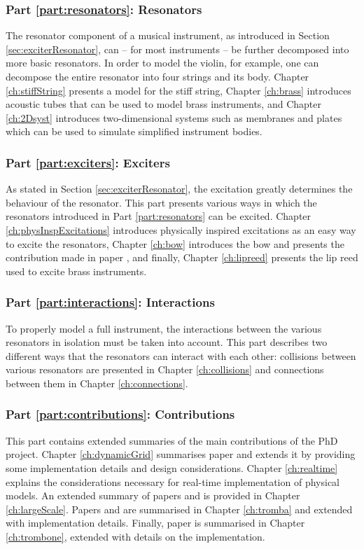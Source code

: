 \subsubsection{Part \ref{part:resonators}: Resonators}
The resonator component of a musical instrument, as introduced in Section \ref{sec:exciterResonator}, can -- for most instruments -- be further decomposed into more basic resonators. In order to model the violin, for example, one can decompose the entire resonator into four strings and its body. Chapter \ref{ch:stiffString} presents a model for the stiff string, Chapter \ref{ch:brass} introduces acoustic tubes that can be used to model brass instruments, and Chapter \ref{ch:2Dsyst} introduces two-dimensional systems such as membranes and plates which can be used to simulate simplified instrument bodies.

\subsubsection{Part \ref{part:exciters}: Exciters} 
As stated in Section \ref{sec:exciterResonator}, the excitation greatly determines the behaviour of the resonator. This part
presents various ways in which the resonators introduced in Part \ref{part:resonators} can be excited. Chapter \ref{ch:physInspExcitations} introduces physically inspired excitations as an easy way to excite the resonators, Chapter \ref{ch:bow} introduces the bow and presents the contribution made in paper \citeP[C], and finally, Chapter \ref{ch:lipreed} presents the lip reed used to excite brass instruments.

\subsubsection{Part \ref{part:interactions}: Interactions}
To properly model a full instrument, the interactions between the various resonators in isolation must be taken into account. This part describes two different ways that the resonators can interact with each other: collisions between various resonators are presented in Chapter \ref{ch:collisions} and connections between them in Chapter \ref{ch:connections}. 

\subsubsection{Part \ref{part:contributions}: Contributions} This part contains extended summaries of the main contributions of the PhD project. Chapter \ref{ch:dynamicGrid} summarises paper \citeP[G] and extends it by providing some implementation details and design considerations. Chapter \ref{ch:realtime} explains the considerations necessary for real-time implementation of physical models. An extended summary of papers \citeP[A] and \citeP[B] is provided in Chapter \ref{ch:largeScale}. Papers \citeP[D] and \citeP[E] are summarised in Chapter \ref{ch:tromba} and extended with implementation details. Finally, paper \citeP[H] is summarised in Chapter \ref{ch:trombone}, extended with details on the implementation.

